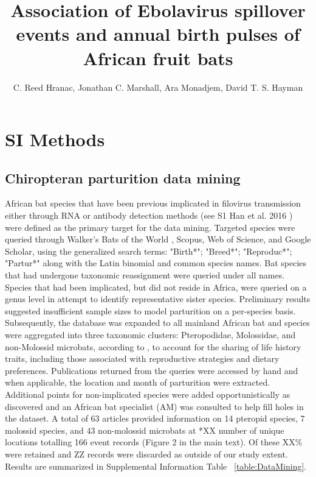 \documentclass[9pt,twoside,lineno]{pnas-new}
\title{Association of Ebolavirus spillover events and annual birth pulses of African fruit bats}
\author{C. Reed Hranac, Jonathan C. Marshall, Ara Monadjem, David T. S. Hayman}
\begin{document}

\maketitle

\SItext


\section*{SI Methods}
\label{SI methods}

\subsection*{Chiropteran parturition data mining}
\label{dataMining}
African bat species that have been previous implicated in filovirus transmission either through RNA or antibody detection methods (see S1 Han et al. 2016 \cite{Han2016UndiscoveredFiloviruses,Walsh2005Wave-likeZaire}) were defined as the primary target for the data mining.
Targeted species were queried through Walker's Bats of the World \cite{Nowak1994WalkersWorld}, Scopus, Web of Science, and Google Scholar, using the generalized search terms: "Birth*"; "Breed*"; "Reproduc*"; "Partur*" along with the Latin binomial and common species names.
Bat species that had undergone taxonomic reassignment were queried under all names. Species that had been implicated, but did not reside in Africa, were queried on a genus level in attempt to identify representative sister species.
Preliminary results suggested insufficient sample sizes to model parturition on a per-species basis. Subsequently, the database was expanded to all mainland African bat and species were aggregated into three taxonomic clusters: Pteropodidae, Molossidae, and non-Molossid microbats, according to \cite{Cumming1997RainfallBats}, to account for the sharing of life history traits, including those associated with reproductive strategies and dietary preferences.
Publications returned from the queries were accessed by hand and when applicable, the location and month of parturition were extracted. Additional points for non-implicated species were added opportunistically as discovered and an African bat specialist (AM) was consulted to help fill holes in the dataset.
A total of 63 articles provided information on 14 pteropid species, 7 molossid species, and 43 non-molossid microbats at *XX number of unique locations totalling 166 event records (Figure 2 in the main text). Of these XX\% were retained and ZZ records were discarded as outside of our study extent.
Results are summarized in Supplemental Information Table ~\ref{table:DataMining}.\par
\end{document}
